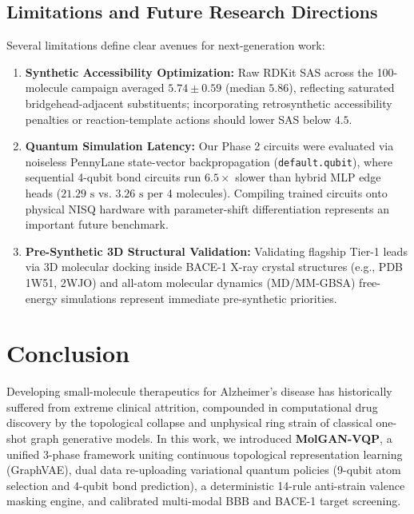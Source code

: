 \documentclass[10pt,a4paper]{article}
\begin{document}
\subsection{Limitations and Future Research Directions}
Several limitations define clear avenues for next-generation work:
\begin{enumerate}[noitemsep]
    \item \textbf{Synthetic Accessibility Optimization:} Raw RDKit SAS across the 100-molecule campaign averaged $5.74 \pm 0.59$ (median $5.86$), reflecting saturated bridgehead-adjacent substituents; incorporating retrosynthetic accessibility penalties or reaction-template actions should lower SAS below $4.5$.
    \item \textbf{Quantum Simulation Latency:} Our Phase 2 circuits were evaluated via noiseless PennyLane state-vector backpropagation (\texttt{default.qubit}), where sequential 4-qubit bond circuits run $6.5\times$ slower than hybrid MLP edge heads ($21.29\text{ s}$ vs. $3.26\text{ s}$ per 4 molecules). Compiling trained circuits onto physical NISQ hardware with parameter-shift differentiation represents an important future benchmark.
    \item \textbf{Pre-Synthetic 3D Structural Validation:} Validating flagship Tier-1 leads via 3D molecular docking inside BACE-1 X-ray crystal structures (e.g., PDB 1W51, 2WJO) and all-atom molecular dynamics (MD/MM-GBSA) free-energy simulations represent immediate pre-synthetic priorities.
\end{enumerate}
\section{Conclusion}
Developing small-molecule therapeutics for Alzheimer's disease has historically suffered from extreme clinical attrition, compounded in computational drug discovery by the topological collapse and unphysical ring strain of classical one-shot graph generative models. In this work, we introduced \textbf{MolGAN-VQP}, a unified 3-phase framework uniting continuous topological representation learning (GraphVAE), dual data re-uploading variational quantum policies (9-qubit atom selection and 4-qubit bond prediction), a deterministic 14-rule anti-strain valence masking engine, and calibrated multi-modal BBB and BACE-1 target screening.
\end{document}
